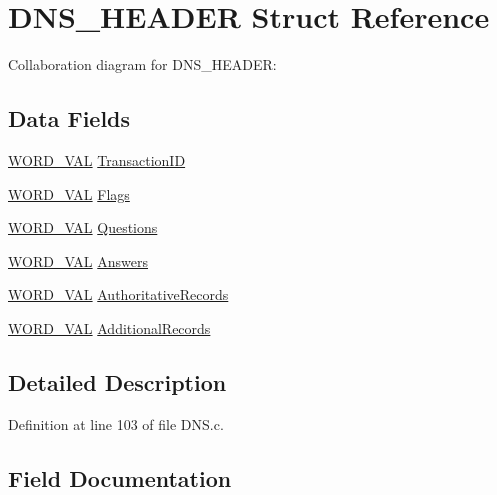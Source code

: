 \hypertarget{struct_d_n_s___h_e_a_d_e_r}{}\section{D\+N\+S\+\_\+\+H\+E\+A\+D\+E\+R Struct Reference}
\label{struct_d_n_s___h_e_a_d_e_r}


Collaboration diagram for D\+N\+S\+\_\+\+H\+E\+A\+D\+E\+R\+:
\subsection*{Data Fields}
\begin{DoxyCompactItemize}
\item 
\hyperlink{union_w_o_r_d___v_a_l}{W\+O\+R\+D\+\_\+\+V\+A\+L} \hyperlink{struct_d_n_s___h_e_a_d_e_r_a5a0dfb5b1d8d29e0a0be61eeaae10de1}{Transaction\+I\+D}
\item 
\hyperlink{union_w_o_r_d___v_a_l}{W\+O\+R\+D\+\_\+\+V\+A\+L} \hyperlink{struct_d_n_s___h_e_a_d_e_r_ad98e1410704c98e4e781e5a0d41ecdf3}{Flags}
\item 
\hyperlink{union_w_o_r_d___v_a_l}{W\+O\+R\+D\+\_\+\+V\+A\+L} \hyperlink{struct_d_n_s___h_e_a_d_e_r_afecf1635048108f6024d67f09c6cb96d}{Questions}
\item 
\hyperlink{union_w_o_r_d___v_a_l}{W\+O\+R\+D\+\_\+\+V\+A\+L} \hyperlink{struct_d_n_s___h_e_a_d_e_r_ab336db123574d581aa20bb3351ab9df4}{Answers}
\item 
\hyperlink{union_w_o_r_d___v_a_l}{W\+O\+R\+D\+\_\+\+V\+A\+L} \hyperlink{struct_d_n_s___h_e_a_d_e_r_a32062e343da3fba14e47d53f5681befa}{Authoritative\+Records}
\item 
\hyperlink{union_w_o_r_d___v_a_l}{W\+O\+R\+D\+\_\+\+V\+A\+L} \hyperlink{struct_d_n_s___h_e_a_d_e_r_ae27a76434a557cec2b8e1e1d8063623f}{Additional\+Records}
\end{DoxyCompactItemize}


\subsection{Detailed Description}


Definition at line 103 of file D\+N\+S.\+c.



\subsection{Field Documentation}
\hypertarget{struct_d_n_s___h_e_a_d_e_r_ae27a76434a557cec2b8e1e1d8063623f}{}

